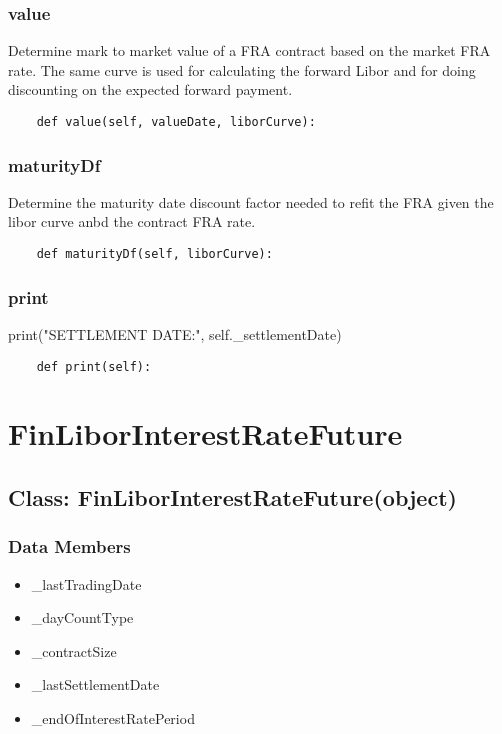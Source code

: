 \documentclass[twoside,11pt]{book}
\begin{document}
\subsubsection*{{\bf value}}
Determine mark to market value of a FRA contract based on the market FRA rate. The same curve is used for calculating the forward Libor and for doing discounting on the expected forward payment.  

\begin{lstlisting}
    def value(self, valueDate, liborCurve):
\end{lstlisting}

\subsubsection*{{\bf maturityDf}}
Determine the maturity date discount factor needed to refit the FRA given the libor curve anbd the contract FRA rate.  

\begin{lstlisting}
    def maturityDf(self, liborCurve):
\end{lstlisting}

\subsubsection*{{\bf print}}
print("SETTLEMENT DATE:", self.\_settlementDate) 

\begin{lstlisting}
    def print(self):
\end{lstlisting}

\newpage
\section{FinLiborInterestRateFuture}

\subsection*{Class: FinLiborInterestRateFuture(object)}


\subsubsection*{Data Members}
\begin{itemize}
\item{\_lastTradingDate}
\item{\_dayCountType}
\item{\_contractSize}
\item{\_lastSettlementDate}
\item{\_endOfInterestRatePeriod}
\end{itemize}
\end{document}

